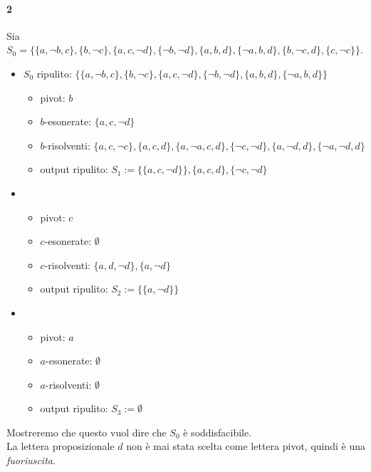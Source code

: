 \paragraph{2}
Sia $S_0 = \{\{a, \neg b, c\}, \{b, \neg c\}, \{a,c,\neg d\}, \{\neg b, \neg d\}, \{a,b,d\}, \{\neg a,b,d\}, \{b, \neg c, d\}, \{c, \neg c\}\}$. 
\begin{itemize}
  \item $S_0$ ripulito: $\{\{a, \neg b, c\}, \{b, \neg c\}, \{a,c,\neg d\}, \{\neg b, \neg d\}, \{a,b,d\}, \{\neg a,b,d\}\}$
    \begin{itemize}
      \item pivot: $b$
      \item $b$-esonerate: $\{a, c, \neg d\}$
      \item $b$-risolventi: $\{a, c, \neg c\}, \{a,c,d\}, \{a, \neg a, c, d\}, \{\neg c, \neg d\}, \{a, \neg d, d\}, \{\neg a, \neg d, d\}$
      \item output ripulito: $S_1 := \{\{a, c, \neg d\}\}, \{a, c,d\}, \{\neg c, \neg d\}$
    \end{itemize}
  \item
    \begin{itemize}
      \item pivot: $c$
      \item $c$-esonerate: $\emptyset$
      \item $c$-risolventi: $\{a, d, \neg d\}, \{a, \neg d\}$
      \item output ripulito: $S_2 := \{\{a, \neg d\}\}$
    \end{itemize}
  \item 
    \begin{itemize}
      \item pivot: $a$
      \item $a$-esonerate: $\emptyset$
      \item $a$-risolventi: $\emptyset$
      \item output ripulito: $S_3 := \emptyset$
    \end{itemize}
\end{itemize}
Mostreremo che questo vuol dire che $S_0$ è soddisfacibile. \\
La lettera proposizionale $d$ non è mai stata scelta come lettera pivot, quindi è una \textit{fuoriuscita}.  

